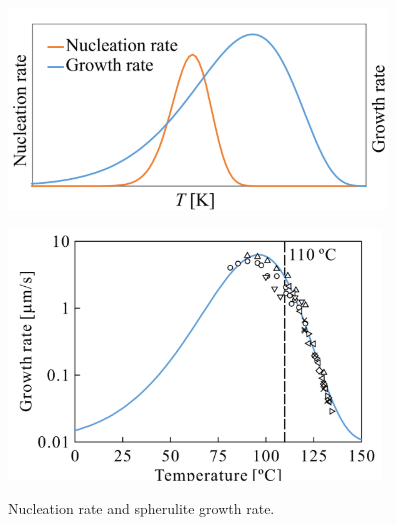\begin{figure}[htbp]
    \begin{minipage}[htbp]{0.45\linewidth}
      \centering
      \includegraphics[keepaspectratio, scale=0.7]{fig/fig_模式図.png}
      \label{fig:模式図}
    \end{minipage}
    \begin{minipage}[htbp]{0.45\linewidth}
      \centering
      \includegraphics[keepaspectratio, scale=0.7]{fig/fig_ポリプロピレン成長速度.png}
      \label{fig:ポリプロピレン成長速度}
    \end{minipage}
    \centering
    \caption{Nucleation rate and spherulite growth rate.}
    \label{fig:核生成速度と成長速度}
\end{figure}